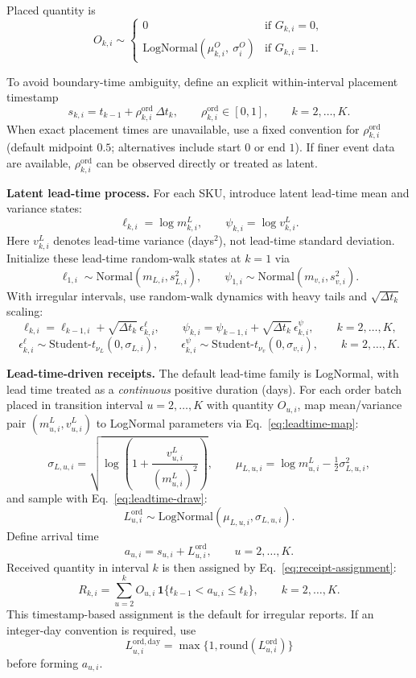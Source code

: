 \documentclass[11pt]{article}
\begin{document}
Placed quantity is
\[
  O_{k,i} \sim
  \begin{cases}
    0 & \text{if } G_{k,i}=0,\\
    \text{LogNormal}(\mu^{O}_{k,i},\ \sigma^{O}_i) & \text{if } G_{k,i}=1.
  \end{cases}
\]

To avoid boundary-time ambiguity, define an explicit within-interval placement timestamp
\[
  s_{k,i}=t_{k-1}+\rho^{\mathrm{ord}}_{k,i}\,\Delta t_k,\qquad \rho^{\mathrm{ord}}_{k,i}\in[0,1],\qquad k=2,\dots,K.
\]
When exact placement times are unavailable, use a fixed convention for $\rho^{\mathrm{ord}}_{k,i}$ (default midpoint $0.5$; alternatives include start $0$ or end $1$). If finer event data are available, $\rho^{\mathrm{ord}}_{k,i}$ can be observed directly or treated as latent.

\textbf{Latent lead-time process.} For each SKU, introduce latent lead-time mean and variance states:
\[
  \ell_{k,i}=\log m^L_{k,i},\qquad \psi_{k,i}=\log v^L_{k,i}.
\]
Here $v^L_{k,i}$ denotes lead-time variance (days$^2$), not lead-time standard deviation.
Initialize these lead-time random-walk states at $k=1$ via
\[
  \ell_{1,i}\sim\text{Normal}(m_{L,i},s_{L,i}^2),\qquad
  \psi_{1,i}\sim\text{Normal}(m_{v,i},s_{v,i}^2).
\]
With irregular intervals, use random-walk dynamics with heavy tails and $\sqrt{\Delta t_k}$ scaling:
\[
  \ell_{k,i}=\ell_{k-1,i}+\sqrt{\Delta t_k}\,\epsilon^{\ell}_{k,i},\qquad
  \psi_{k,i}=\psi_{k-1,i}+\sqrt{\Delta t_k}\,\epsilon^{\psi}_{k,i},\qquad k=2,\dots,K,
\]
\[
  \epsilon^{\ell}_{k,i}\sim\text{Student-}t_{\nu_L}(0,\sigma_{L,i}),\qquad
  \epsilon^{\psi}_{k,i}\sim\text{Student-}t_{\nu_v}(0,\sigma_{v,i}),\qquad k=2,\dots,K.
\]

\textbf{Lead-time-driven receipts.} The default lead-time family is LogNormal, with lead time treated as a \emph{continuous} positive duration (days).
For each order batch placed in transition interval $u=2,\dots,K$ with quantity $O_{u,i}$, map mean/variance pair $(m^L_{u,i},v^L_{u,i})$ to LogNormal parameters via Eq.~\eqref{eq:leadtime-map}:
\begin{equation}\label{eq:leadtime-map}
  \sigma_{L,u,i}=\sqrt{\log\!\left(1+\frac{v^L_{u,i}}{(m^L_{u,i})^2}\right)},\qquad
  \mu_{L,u,i}=\log m^L_{u,i}-\tfrac{1}{2}\sigma^2_{L,u,i},
\end{equation}
and sample with Eq.~\eqref{eq:leadtime-draw}:
\begin{equation}\label{eq:leadtime-draw}
  L^{\mathrm{ord}}_{u,i} \sim \text{LogNormal}(\mu_{L,u,i},\sigma_{L,u,i}).
\end{equation}
Define arrival time
\[
  a_{u,i}=s_{u,i}+L^{\mathrm{ord}}_{u,i},\qquad u=2,\dots,K.
\]
Received quantity in interval $k$ is then assigned by Eq.~\eqref{eq:receipt-assignment}:
\begin{equation}\label{eq:receipt-assignment}
  R_{k,i}=\sum_{u=2}^{k} O_{u,i}\,\mathbf{1}\{t_{k-1}<a_{u,i}\le t_k\},\qquad k=2,\dots,K.
\end{equation}
This timestamp-based assignment is the default for irregular reports. If an integer-day convention is required, use
\[
  L^{\mathrm{ord,day}}_{u,i}=\max\{1,\mathrm{round}(L^{\mathrm{ord}}_{u,i})\}
\]
before forming $a_{u,i}$.
\end{document}
